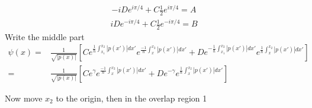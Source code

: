 \begin{align*}
    -iD
    e^{i\pi /4}
    +
    C
    \frac{1}{2}e^{i\pi /4}
    =A
\end{align*}
\begin{align*}
    iD
    e^{-i\pi /4}
    +
    C
    \frac{1}{2}e^{-i\pi /4}
    =B
\end{align*}
Write the middle part 
\begin{align*}
    \psi(x)
    =&\frac{1}{\sqrt{|p(x)|}}
    \left[
    Ce^{\frac{1}{\hbar}\int_{x_1}^{x_2}|p(x')|dx'}
    e^{\frac{-1}{\hbar}\int_{x}^{x_2}|p(x')|dx'}
    +
    De^{-\frac{1}{\hbar}\int_{x_1}^{x_2}|p(x')|dx'}
    e^{\frac{1}{\hbar}\int_{x}^{x_2}|p(x')|dx'}
    \right]\\
    =&
    \frac{1}{\sqrt{|p(x)|}}
    \left[
    Ce^\gamma
    e^{\frac{-1}{\hbar}\int_{x}^{x_2}|p(x')|dx'}
    +
    De^{-\gamma}
    e^{\frac{1}{\hbar}\int_{x}^{x_2}|p(x')|dx'}
    \right]
\end{align*}


Now move $x_2$ to the origin, then in the overlap region 1

